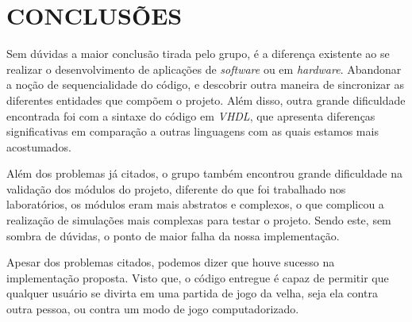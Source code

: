 \section{CONCLUSÕES}
Sem dúvidas a maior conclusão tirada pelo grupo, é a diferença existente ao se realizar o desenvolvimento de aplicações de \emph{software} ou em \emph{hardware}. Abandonar a noção de sequencialidade do código, e descobrir outra maneira de sincronizar as diferentes entidades que compõem o projeto. Além disso, outra grande dificuldade encontrada foi com a sintaxe do código em \emph{VHDL}, que apresenta diferenças significativas em comparação a outras linguagens com as quais estamos mais acostumados.

Além dos problemas já citados, o grupo também encontrou grande dificuldade na validação dos módulos do projeto, diferente do que foi trabalhado nos laboratórios, os módulos eram mais abstratos e complexos, o que complicou a realização de simulações mais complexas para testar o projeto. Sendo este, sem sombra de dúvidas, o ponto de maior falha da nossa implementação.

Apesar dos problemas citados, podemos dizer que houve sucesso na implementação proposta. Visto que, o código entregue é capaz de permitir que qualquer usuário se divirta em uma partida de jogo da velha, seja ela contra outra pessoa, ou contra um modo de jogo computadorizado.